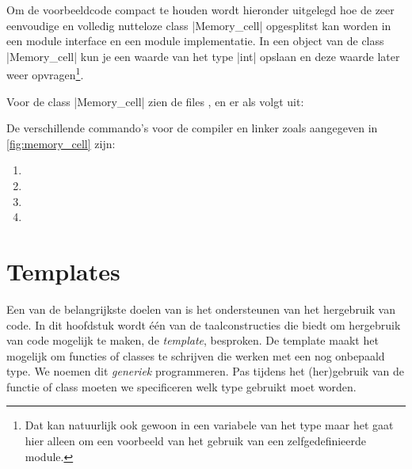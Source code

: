 \begin{cpplstShortInline}

Om de voorbeeldcode compact te houden wordt hieronder uitgelegd hoe de zeer eenvoudige en volledig nutteloze class |Memory_cell| opgesplitst kan worden in een module interface en een module implementatie.
In een object van de class |Memory_cell| kun je een waarde van het type |int| opslaan en deze waarde later weer opvragen\footnote{%
	Dat kan natuurlijk ook gewoon in een variabele van het type  maar het gaat hier alleen om een voorbeeld van het gebruik van een zelfgedefinieerde module.
}.

Voor de class |Memory_cell| zien de files ,  en  er als volgt uit:


De verschillende commando's voor de compiler en linker zoals aangegeven in \cref{fig:memory_cell} zijn:
\begin{enumerate}
	\item {}
	\item {}
	\item {}
	\item {}
\end{enumerate} 



\chapter{Templates}
\label{sec:templates}\label{H3}
Een van de belangrijkste doelen van \Cpp{} is het ondersteunen van het hergebruik van code.
In dit hoofdstuk wordt één van de taalconstructies die \Cpp{} biedt om hergebruik van code mogelijk te maken, de \emph{template}, besproken.
De template maakt het mogelijk om functies of classes te schrijven die werken met een nog onbepaald type.
We noemen dit \emph{generiek} programmeren.
Pas tijdens het (her)gebruik van de functie of class moeten we specificeren welk type gebruikt moet worden.


\end{cpplstShortInline}

